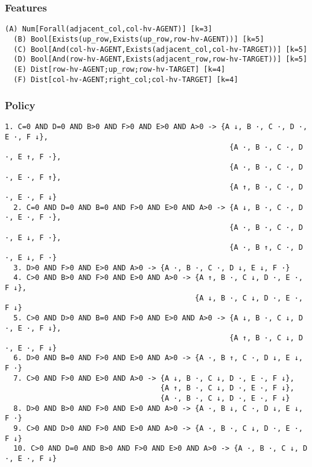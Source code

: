 \documentclass[a4paper]{article}
\begin{document}
\subsubsection{Features}
\begin{Verbatim}[fontsize=\footnotesize]
  (A) Num[Forall(adjacent_col,col-hv-AGENT)] [k=3]
  (B) Bool[Exists(up_row,Exists(up_row,row-hv-AGENT))] [k=5]
  (C) Bool[And(col-hv-AGENT,Exists(adjacent_col,col-hv-TARGET))] [k=5]
  (D) Bool[And(row-hv-AGENT,Exists(adjacent_row,row-hv-TARGET))] [k=5]
  (E) Dist[row-hv-AGENT;up_row;row-hv-TARGET] [k=4]
  (F) Dist[col-hv-AGENT;right_col;col-hv-TARGET] [k=4]

\end{Verbatim}

\subsubsection{Policy}
\begin{Verbatim}[fontsize=\footnotesize]
  1. C=0 AND D=0 AND B>0 AND F>0 AND E>0 AND A>0 -> {A ↓, B ·, C ·, D ·, E ·, F ↓},
                                                    {A ·, B ·, C ·, D ·, E ↑, F ·},
                                                    {A ·, B ·, C ·, D ·, E ·, F ↑},
                                                    {A ↑, B ·, C ·, D ·, E ·, F ↓}
  2. C=0 AND D=0 AND B=0 AND F>0 AND E>0 AND A>0 -> {A ↓, B ·, C ·, D ·, E ·, F ·},
                                                    {A ·, B ·, C ·, D ·, E ↓, F ·},
                                                    {A ·, B ↑, C ·, D ·, E ↓, F ·}
  3. D>0 AND F>0 AND E>0 AND A>0 -> {A ·, B ·, C ·, D ↓, E ↓, F ·}
  4. C>0 AND B>0 AND F>0 AND E>0 AND A>0 -> {A ↑, B ·, C ↓, D ·, E ·, F ↓},
                                            {A ↓, B ·, C ↓, D ·, E ·, F ↓}
  5. C>0 AND D>0 AND B=0 AND F>0 AND E>0 AND A>0 -> {A ↓, B ·, C ↓, D ·, E ·, F ↓},
                                                    {A ↑, B ·, C ↓, D ·, E ·, F ↓}
  6. D>0 AND B=0 AND F>0 AND E>0 AND A>0 -> {A ·, B ↑, C ·, D ↓, E ↓, F ·}
  7. C>0 AND F>0 AND E>0 AND A>0 -> {A ↓, B ·, C ↓, D ·, E ·, F ↓},
                                    {A ↑, B ·, C ↓, D ·, E ·, F ↓},
                                    {A ·, B ·, C ↓, D ·, E ·, F ↓}
  8. D>0 AND B>0 AND F>0 AND E>0 AND A>0 -> {A ·, B ↓, C ·, D ↓, E ↓, F ·}
  9. C>0 AND D>0 AND F>0 AND E>0 AND A>0 -> {A ·, B ·, C ↓, D ·, E ·, F ↓}
  10. C>0 AND D=0 AND B>0 AND F>0 AND E>0 AND A>0 -> {A ·, B ·, C ↓, D ·, E ·, F ↓}
\end{Verbatim}
\end{document}
